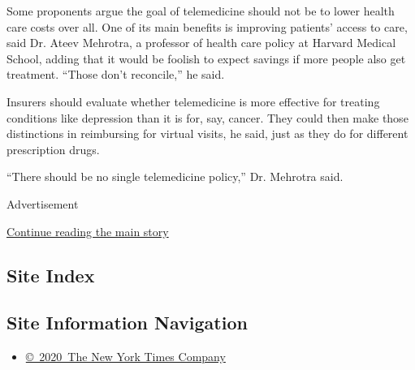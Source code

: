 Some proponents argue the goal of telemedicine should not be to lower
health care costs over all. One of its main benefits is improving
patients' access to care, said Dr. Ateev Mehrotra, a professor of health
care policy at Harvard Medical School, adding that it would be foolish
to expect savings if more people also get treatment. ``Those don't
reconcile,'' he said.

Insurers should evaluate whether telemedicine is more effective for
treating conditions like depression than it is for, say, cancer. They
could then make those distinctions in reimbursing for virtual visits, he
said, just as they do for different prescription drugs.

``There should be no single telemedicine policy,'' Dr. Mehrotra said.

Advertisement

\protect\hyperlink{after-bottom}{Continue reading the main story}

\hypertarget{site-index}{%
\subsection{Site Index}\label{site-index}}

\hypertarget{site-information-navigation}{%
\subsection{Site Information
Navigation}\label{site-information-navigation}}

\begin{itemize}
\tightlist
\item
  \href{https://help.nytimes3xbfgragh.onion/hc/en-us/articles/115014792127-Copyright-notice}{©~2020~The
  New York Times Company}
\end{itemize}

